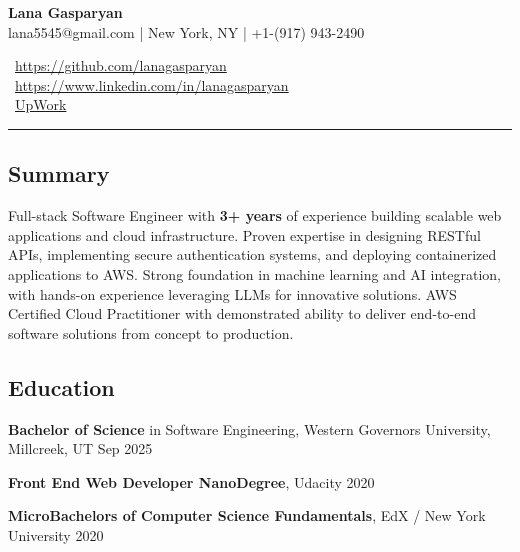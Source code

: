 \documentclass[11pt,letterpaper]{article}
\newcommand{\normalsizesection}{\normalsize}
\newcommand{\smallersection}{\small}
\newcommand{\sectionbox}[1]{%
    \vspace{0.2em}
    \begin{tcolorbox}[
        colback=sectionbg,
        colframe=sectionbg,
        width=\textwidth,
        left=5pt,
        right=5pt,
        top=2pt,
        bottom=2pt,
        boxrule=0pt,
        arc=0pt,
        boxsep=0pt,
    ]
    \section*{#1}
    \end{tcolorbox}
    \vspace{-0.3em}
}
\newcommand{\iconlink}[3]{%
    #1~\href{#2}{#3}%
}
\begin{document}
\begin{minipage}[t]{0.6\textwidth}
    \vspace{0pt}
    \fontsize{24pt}{28pt}\selectfont\textbf{\color{namecolor}Lana Gasparyan}\\[8pt]
    \footnotesize lana5545@gmail.com | New York, NY | +1-(917) 943-2490
\end{minipage}%
\begin{minipage}[t]{0.4\textwidth}
    \vspace{0pt}
    \raggedright
    \footnotesize\iconlink{\faGithub}{https://github.com/lanagasparyan}{https://github.com/lanagasparyan}\\
    \footnotesize\iconlink{\faLinkedin}{https://www.linkedin.com/in/lanagasparyan}{https://www.linkedin.com/in/lanagasparyan}\\
    \footnotesize\iconlink{\faBriefcase}{https://www.upwork.com/freelancers/~lanagasparyan}{UpWork}
\end{minipage}

\vspace{-1mm}
\noindent\rule{\textwidth}{0.4pt}
\vspace{-4mm}

\sectionbox{Summary}
\smallersection

\noindent Full-stack Software Engineer with \textbf{3+ years} of experience building scalable web applications and cloud infrastructure. Proven expertise in designing RESTful APIs, implementing secure authentication systems, and deploying containerized applications to AWS. Strong foundation in machine learning and AI integration, with hands-on experience leveraging LLMs for innovative solutions. AWS Certified Cloud Practitioner with demonstrated ability to deliver end-to-end software solutions from concept to production.

\normalsizesection

\sectionbox{Education}
\smallersection

\noindent\textbf{Bachelor of Science} in Software Engineering, Western Governors University, Millcreek, UT \hfill Sep 2025

\vspace{-1pt}
\noindent\textbf{Front End Web Developer NanoDegree}, Udacity \hfill 2020

\vspace{-1pt}
\noindent\textbf{MicroBachelors of Computer Science Fundamentals}, EdX / New York University \hfill 2020
\end{document}
